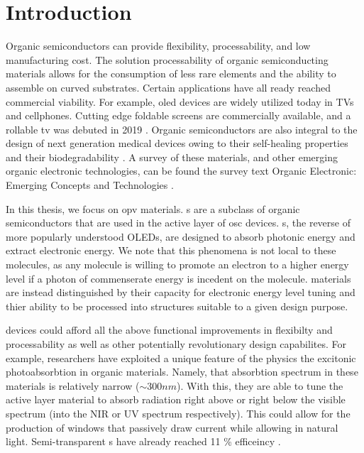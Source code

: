\chapter{Introduction} 

Organic semiconductors can provide flexibility, processability, and low manufacturing cost. 
The solution processability of organic semiconducting materials allows for the consumption of less rare elements
and the ability to assemble on curved substrates. Certain applications have all ready reached commercial
viability.  
For example, \gls{oled} devices are widely utilized today in TVs and cellphones.  
Cutting edge foldable  screens are commercially available, and a rollable tv was debuted in 2019
\cite{Chen2020}. 
Organic semiconductors are also integral to the design of next generation medical devices owing to their
self-healing properties and their biodegradability \cite{Bettinger2010}. 
A survey of these materials, and 
other emerging organic electronic technologies, can be found the survey text 
Organic Electronic: Emerging Concepts and Technologies
\cite{FabioCicoiraEditor2013}. 

In this thesis, we focus on \gls{opv} materials. s are a subclass of organic semiconductors that are
used in the active layer of \gls{osc} devices. 
s, the reverse of more popularly understood OLEDs,
are designed to absorb photonic energy and extract electronic energy. 
We note that this phenomena is not
local to these molecules, as any molecule is willing to promote an electron to a higher energy level if a
photon of commenserate energy is incedent on the molecule.  materials are instead distinguished by
their capacity for electronic energy level 
tuning and thier ability to be processed into structures suitable to a given design purpose.

 devices could afford all the above functional improvements in flexibilty and processability as well as other
potentially revolutionary design capabilites.  
For example, researchers have exploited a unique feature of the physics the excitonic photoabsorbtion in 
organic materials. Namely, that absorbtion spectrum
in these materials is relatively narrow (${\sim}300nm$).
With this, they are able to tune the active layer material to absorb radiation right above or right below the
visible spectrum (into the NIR or UV spectrum respectively). This 
could allow for the production of windows that passively draw current while allowing in natural light. Semi-transparent s have already
reached 11 \% efficeincy \cite{Brabec2020}. 

